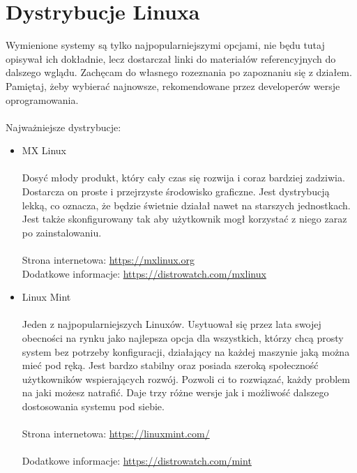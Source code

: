 \documentclass[10pt,a4paper]{report}
\begin{document}
	\section{Dystrybucje Linuxa}
	
Wymienione systemy są tylko najpopularniejszymi opcjami, nie będu tutaj opisywał ich dokładnie, lecz dostarczał linki do materiałów referencyjnych do dalszego wglądu. Zachęcam do własnego rozeznania po zapoznaniu się z działem. Pamiętaj, żeby wybierać najnowsze, rekomendowane przez developerów wersje oprogramowania.\\\\
Najważniejsze dystrybucje:\\
\begin{itemize}
\item {\Huge MX Linux\\\\} Dosyć młody produkt, który cały czas się rozwija i coraz bardziej zadziwia. Dostarcza on proste i przejrzyste środowisko graficzne. Jest dystrybucją lekką, co oznacza, że będzie świetnie działał nawet na starszych jednostkach. Jest także skonfigurowany tak aby użytkownik mogł korzystać z niego zaraz po zainstalowaniu.\\\\Strona internetowa: \url{https://mxlinux.org}\\ Dodatkowe informacje: \href{https://distrowatch.com/table.php?distribution=mx}{https://distrowatch.com/mxlinux}\\
\item {\Huge Linux Mint \\\\} Jeden z najpopularniejszych Linuxów. Usytuował się przez lata swojej obecności na rynku jako najlepsza opcja dla wszystkich, którzy chcą prosty system bez potrzeby konfiguracji, działający na każdej maszynie jaką można mieć pod ręką. Jest bardzo stabilny oraz posiada szeroką społeczność użytkowników wspierających rozwój. Pozwoli ci to rozwiązać, każdy problem na jaki możesz natrafić. Daje trzy różne wersje jak i możliwość dalszego dostosowania systemu pod siebie.\\\\Strona internetowa: \href{https://www.linuxmint.com/}{https://linuxmint.com/}\\\\ Dodatkowe informacje: \href{https://distrowatch.com/table.php?distribution=mint}{https://distrowatch.com/mint}

\end{itemize}
\end{document}

